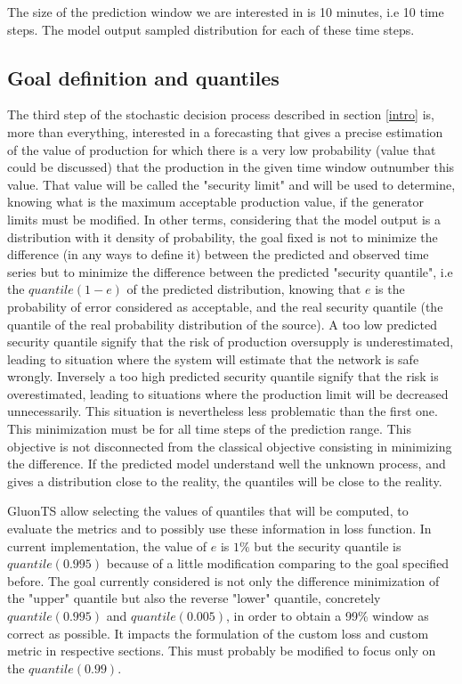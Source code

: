 \documentclass[a4paper, 12pt]{article}
\begin{document}
The size of the prediction window we are interested in is 10 minutes, i.e 10 time steps.
The model output sampled distribution for each of these time steps. 



\subsection{Goal definition and quantiles} \label{goal}

The third step of the stochastic decision process described in section \ref{intro} is, more than everything, interested in a forecasting that gives a precise estimation of the value of production for which there is a very low probability (value that could be discussed) that the production in the given time window outnumber this value. That value will be called the "security limit" and will be used to determine, knowing what is the maximum acceptable production value, if the generator limits must be modified.
In other terms, considering that the model output is a distribution with it density of probability, the goal fixed is not to minimize the difference (in any ways to define it) between the predicted and observed time series but to minimize the difference between the predicted "security quantile", i.e the $quantile(1-e)$ of the predicted distribution, knowing that $e$ is the probability of error considered as acceptable, and the real security quantile (the quantile of the real probability distribution of the source).
A too low predicted security quantile signify that the risk of production oversupply is underestimated,
leading to situation where the system will estimate that the network is safe wrongly. 
Inversely a too high predicted security quantile signify that the risk is overestimated, leading to situations where the production limit will be decreased unnecessarily. This situation is nevertheless less problematic than the first one.
This minimization must be for all time steps of the prediction range. 
This objective is not disconnected from the classical objective consisting in minimizing the difference. 
If the predicted model understand well the unknown process, and gives a distribution close to the reality, the quantiles will be close to the reality.


GluonTS allow selecting the values of quantiles that will be computed, to evaluate the metrics and to possibly use these information in loss function.
In current implementation, the value of $e$ is $1\%$ but the security quantile is $quantile(0.995)$ because of a little modification comparing to the goal specified before. The goal currently considered is not only the difference minimization of the "upper" quantile but also the reverse "lower" quantile, concretely $quantile(0.995)$ and $ quantile(0.005)$, in order to obtain a 99\% window as correct as possible. It impacts the formulation of the custom loss and custom metric in respective sections. This must probably be modified to focus only on the $quantile(0.99)$.
  
\end{document}
